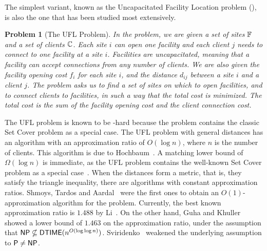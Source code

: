 \documentclass[oneside,final]{ucr}
\newtheorem{problem}[theorem]{Problem}
\begin{document}
The simplest variant, known as the Uncapacitated Facility
Location problem ({\UFL}), is also the one that has been
studied most extensively. 
\begin{problem}[The UFL Problem]
  In the {\UFL} problem, we are given a set of sites
  $\mathbb{F}$ and a set of clients $\mathbb{C}$. Each site
  $i$ can open one facility and each client $j$ needs to
  connect to one facility at a site $i$. Facilities are
  uncapacitated, meaning that a facility can accept
  connections from any number of clients. We are also given
  the facility opening cost $f_i$ for each site $i$, and the
  distance $d_{ij}$ between a site $i$ and a client $j$. The
  problem asks us to find a set of sites on which to open
  facilities, and to connect clients to facilities, in such
  a way that the total cost is minimized. The total cost is
  the sum of the facility opening cost and the client
  connection cost.
\end{problem}
The UFL problem is known to be \NP-hard because the problem
contains the classic Set Cover problem as a special
case. The UFL problem with general distances has an
algorithm with an approximation ratio of $O(\log n)$, where
$n$ is the number of clients. This algorithm is due to
Hochbaum~\cite{Hochbaum82}. A matching lower bound of
$\Omega(\log n)$ is immediate, as the UFL problem contains
the well-known Set Cover problem as a special
case~\cite{Hochbaum82}. When the distances form a metric,
that is, they satisfy the triangle inequality, there are
algorithms with constant approximation ratios. Shmoys,
Tardos and Aardal~\cite{ShmoysTA97} were the first ones to
obtain an $O(1)$-approximation algorithm for the {\UFL}
problem. Currently, the best known approximation ratio is
$1.488$ by Li~\cite{Li11}. On the other hand, Guha and
Khuller~\cite{GuhaK98} showed a lower bound of $1.463$ on
the approximation ratio, under the assumption that ${\mbox{\sf NP}}
\nsubseteq {\mbox{\sf DTIME}}(n^{O(\log\log
  n)})$. Sviridenko~\cite{Vygen05} weakened the underlying
assumption to ${\mbox{\sf P}} \neq {\mbox{\sf NP}}$.
\end{document}
